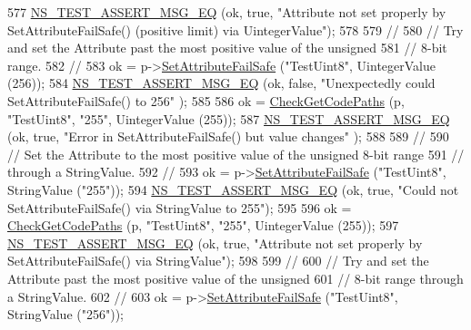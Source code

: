 \begin{DoxyCode}
577   \hyperlink{group__testing_ga2a9d78cffb3db8e867c35fff0b698cf5}{NS\_TEST\_ASSERT\_MSG\_EQ} (ok, \textcolor{keyword}{true}, \textcolor{stringliteral}{"Attribute not set properly by
       SetAttributeFailSafe() (positive limit) via UintegerValue"});
578 
579   \textcolor{comment}{//}
580   \textcolor{comment}{// Try and set the Attribute past the most positive value of the unsigned }
581   \textcolor{comment}{// 8-bit range.}
582   \textcolor{comment}{//}
583   ok = p->\hyperlink{classns3_1_1ObjectBase_aa7d333004e970f925a4ed5df275541b5}{SetAttributeFailSafe} (\textcolor{stringliteral}{"TestUint8"}, UintegerValue (256));
584   \hyperlink{group__testing_ga2a9d78cffb3db8e867c35fff0b698cf5}{NS\_TEST\_ASSERT\_MSG\_EQ} (ok, \textcolor{keyword}{false}, \textcolor{stringliteral}{"Unexpectedly could SetAttributeFailSafe() to 256"}
      );
585 
586   ok = \hyperlink{classAttributeTestCase_a902fb84c803f1c898329f9263575331e}{CheckGetCodePaths} (p, \textcolor{stringliteral}{"TestUint8"}, \textcolor{stringliteral}{"255"}, UintegerValue (255));
587   \hyperlink{group__testing_ga2a9d78cffb3db8e867c35fff0b698cf5}{NS\_TEST\_ASSERT\_MSG\_EQ} (ok, \textcolor{keyword}{true}, \textcolor{stringliteral}{"Error in SetAttributeFailSafe() but value changes"}
      );
588 
589   \textcolor{comment}{//}
590   \textcolor{comment}{// Set the Attribute to the most positive value of the unsigned 8-bit range}
591   \textcolor{comment}{// through a StringValue.}
592   \textcolor{comment}{//}
593   ok = p->\hyperlink{classns3_1_1ObjectBase_aa7d333004e970f925a4ed5df275541b5}{SetAttributeFailSafe} (\textcolor{stringliteral}{"TestUint8"}, StringValue (\textcolor{stringliteral}{"255"}));
594   \hyperlink{group__testing_ga2a9d78cffb3db8e867c35fff0b698cf5}{NS\_TEST\_ASSERT\_MSG\_EQ} (ok, \textcolor{keyword}{true}, \textcolor{stringliteral}{"Could not SetAttributeFailSafe() via StringValue
       to 255"});
595 
596   ok = \hyperlink{classAttributeTestCase_a902fb84c803f1c898329f9263575331e}{CheckGetCodePaths} (p, \textcolor{stringliteral}{"TestUint8"}, \textcolor{stringliteral}{"255"}, UintegerValue (255));
597   \hyperlink{group__testing_ga2a9d78cffb3db8e867c35fff0b698cf5}{NS\_TEST\_ASSERT\_MSG\_EQ} (ok, \textcolor{keyword}{true}, \textcolor{stringliteral}{"Attribute not set properly by
       SetAttributeFailSafe() via StringValue"});
598 
599   \textcolor{comment}{//}
600   \textcolor{comment}{// Try and set the Attribute past the most positive value of the unsigned}
601   \textcolor{comment}{// 8-bit range through a StringValue.}
602   \textcolor{comment}{//}
603   ok = p->\hyperlink{classns3_1_1ObjectBase_aa7d333004e970f925a4ed5df275541b5}{SetAttributeFailSafe} (\textcolor{stringliteral}{"TestUint8"}, StringValue (\textcolor{stringliteral}{"256"}));

\end{DoxyCode}
